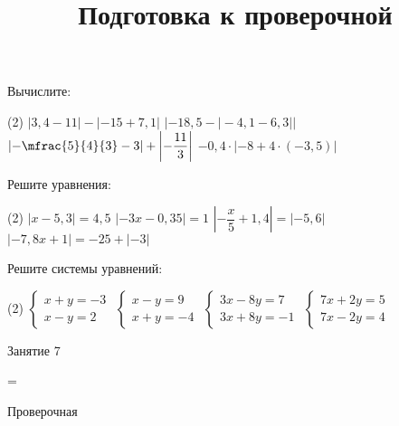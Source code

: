 \begin{homework}[number=3]
	\begin{listofex}
		\item Вычислите:
		\begin{tasks}(2)
			\task \( |3,4-11|-|-15+7,1| \)
			\task \( |-18,5-|-4,1-6,3|| \)
			\task \( \left| -\mfrac{5 }{4 }{3 } - 3 \right| + \left| -\dfrac{ 11 }{ 3 } \right| \)
			\task \( -0,4 \cdot |-8 + 4 \cdot (-3,5)| \)
		\end{tasks}
		\item Решите уравнения:
		\begin{tasks}(2)
			\task \( |x-5,3|=4,5 \)
			\task \( |-3x-0,35|=1 \)
			\task \( \left| -\dfrac{ x }{ 5 }+1,4 \right|=|-5,6| \)
			\task \( |-7,8x+1|=-25 + |-3| \)
		\end{tasks}
		\item Решите системы уравнений: %
		\begin{tasks}(2)
			\task \( \begin{cases} x+y=-3 \\ x-y=2 \end{cases} \)
			\task \( \begin{cases} x-y=9 \\ x+y=-4 \end{cases} \)
			\task \( \begin{cases} 3x-8y=7 \\ 3x+8y=-1 \end{cases} \)
			\task \( \begin{cases} 7x+2y=5 \\ 7x-2y=4 \end{cases} \)
		\end{tasks}
	\end{listofex}
\end{homework}

\begin{class}[number=7]
	\title{Подготовка к проверочной}
	\begin{listofex}
		\item Занятие 7
	\end{listofex}
\end{class}

=%
\begin{exam}
	\begin{listofex}
		\item Проверочная
	\end{listofex}
\end{exam}
